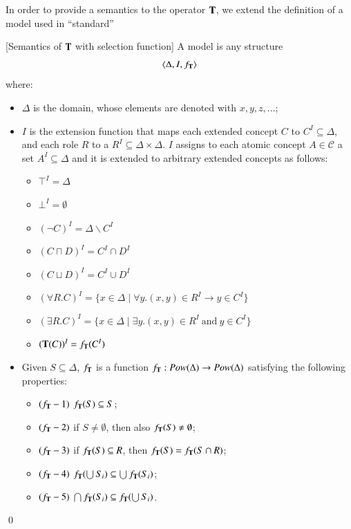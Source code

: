 \documentclass[a4paper, 11pt, oneside]{elsarticle}
\newcommand{\tip}{{\bf T}}
\newcommand{\alc}{\mathcal{ALC}}
\newcommand {\vuoto} {\emptyset}
\newcommand {\nott} {\lnot}
\newcommand {\tc} {\mid}
\newcommand {\imp} {\rightarrow}
\newenvironment{definition}
{\begin{defi} \rm}{\qed \end{defi}}
\newcounter{posu}
\newtheorem{definition}[posu]{Definition}
\begin{document}
In order to provide a semantics to the operator $\tip$, we extend the definition of a model used in ``standard''

\begin{definition}[Semantics of $\tip$ with selection function]\label{Semantics
with f_tip} A model is any structure $$\langle \Delta, I, f_\tip \rangle$$
where:

\begin{itemize}
\item $\Delta$ is the domain, whose elements are denoted with $x, y, z, \dots$;
\item $I$ is the extension function that
maps each extended concept $C$
to $C^I \subseteq \Delta$, and each role $R$ to a $R^I \subseteq
\Delta \times \Delta$. $I$ assigns to each atomic concept $A \in
\mathcal{C}$ a set $A^I \subseteq \Delta$ and it is extended to
arbitrary extended concepts as follows:

\begin{itemize}
  \item $\top^I=\Delta$
  \item $\bot^I=\vuoto$
  \item $(\nott C)^I=\Delta \backslash C^I$
  \item $(C \sqcap D)^I=C^I \cap D^I$
  \item $(C \sqcup D)^I=C^I \cup D^I$
  \item $(\forall R.C)^I=\{x \in \Delta \tc \forall y. (x,y) \in R^I \imp y \in C^I\}$
  \item $(\exists R.C)^I=\{x \in \Delta \tc \exists y.(x,y) \in R^I \ \mbox{and} \ y \in C^I\}$
  \item $(\tip(C))^I = f_\tip(C^I)$
\end{itemize}


\item Given $S \subseteq \Delta$, $f_\tip$ is a function $f_\tip : Pow(\Delta) \rightarrow Pow(\Delta)$
satisfying the
following properties:

\begin{itemize}
\item $(f_\tip-1)$ $f_\tip(S) \subseteq S$;
\item $(f_\tip-2)$ if $S \neq \emptyset$, then also $f_\tip(S)
\neq \emptyset$;
\item $(f_\tip-3)$ if $f_\tip(S) \subseteq R$, then $f_\tip(S) = f_\tip(S \cap R)$;
 \item $(f_\tip-4)$ $f_\tip(\bigcup S_i ) \subseteq \bigcup f_\tip(S_i)$;
\item $(f_\tip-5)$ $\bigcap f_\tip(S_i) \subseteq  f_\tip(\bigcup S_i)$.
\end{itemize}

\end{itemize}

\end{definition}
\end{document}
